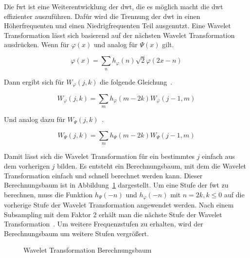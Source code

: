 \documentclass[12pt, a4paper, ngerman]{article}
\begin{document}
Die \acf{fwt} ist eine Weiterentwicklung der \ac{dwt},
die es möglich macht die \ac{dwt} effizienter auszuführen.
Dafür wird die Trennung der \ac{dwt} in einen Höherfrequenten
und einen Niedrigfrequenten Teil ausgenutzt.
Eine Wavelet Transformation lässt sich basierend
auf der nächsten Wavelet Transformation ausdrücken.
Wenn für \(\varphi(x)\) und analog für \(\Psi(x)\) gilt.

\[
  \varphi(x) = \sum_n h_{\varphi}(n)\sqrt{2}\varphi(2x-n)
\]

Dann ergibt sich für \(W_\varphi(j,k)\) die folgende Gleichung~\cite[S.11]{wavelet_analysis}.

\[
  W_\varphi(j,k)=\sum_m h_\varphi(m-2k)W_\varphi(j-1,m)
\]

Und analog dazu für \(W_\Psi(j,k)\)~\cite[S.11]{wavelet_analysis}.

\[
  W_\Psi(j,k)=\sum_m h_\Psi(m-2k)W_\Psi(j-1,m)
\]

Damit lässt sich die Wavelet Transformation für ein bestimmtes \(j\)
einfach aus dem vorherigen \(j\) bilden.
Es entsteht ein Berechnungsbaum, mit dem die Wavelet Transformation
einfach und schnell berechnet werden kann.
Dieser Berechnungsbaum ist in Abbildung~\ref{fig:wavelet_tree} dargestellt.
Um eine Stufe der \ac{fwt} zu berechnen,
muss die Funktion \(h_\Psi(-n)\) und \(h_\varphi(-n)\) mit \(n=2k,k\leq 0\)
auf die vorherige Stufe der Wavelet Transformation angewendet werden.
Nach einem Subsampling mit dem Faktor 2 erhält man
die nächste Stufe der Wavelet Transformation~\cite[S.12]{wavelet_analysis}.
Um weitere Frequenzstufen zu erhalten,
wird der Berechnungsbaum um weitere Stufen vergrößert.

\begin{figure}
  \centering
  \caption{Wavelet Transformation Berechnungsbaum}
  \label{fig:wavelet_tree}
\end{figure}
\end{document}
